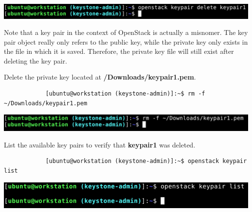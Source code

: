 \documentclass[letterpaper, 12pt]{article}
\begin{document}
\begin{enumerate}
\begin{labstep}
        \begin{center}
            \includegraphics[width=\linewidth]{images/part7/step7.png}
        \end{center}
    \end{labstep}

    \begin{notebox}
        Note that a key pair in the context of OpenStack is actually a misnomer.
        The key pair object really only refers to the public key, while the private key only exists in the file in which it is saved.
        Therefore, the private key file will still exist after deleting the key pair.
    \end{notebox}

    \begin{labstep}
        Delete the private key located at \textbf{\texttildemid/Downloads/keypair1.pem}.
        \begin{lstlisting}
            [ubuntu@workstation (keystone-admin)]:~$ rm -f ~/Downloads/keypair1.pem
        \end{lstlisting}

        \begin{center}
            \includegraphics[width=\linewidth]{images/part7/step8.png}
        \end{center}
    \end{labstep}

    \begin{labstep}
        List the available key pairs to verify that \textbf{keypair1} was deleted.
        \begin{lstlisting}
            [ubuntu@workstation (keystone-admin)]:~$ openstack keypair list
        \end{lstlisting}

        \begin{center}
            \includegraphics[width=\linewidth]{images/part7/step9.png}
        \end{center}
    \end{labstep}


\end{enumerate}
\end{document}
